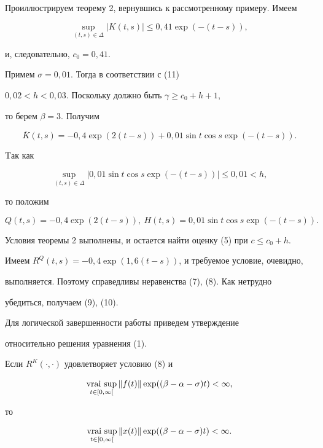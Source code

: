 Проиллюстрируем теорему 2, вернувшись к рассмотренному примеру. Имеем


$$


\sup\limits_{(t,s)\in\Delta}|K(t,s)|\le 0,41\exp(-(t-s)),


$$


и, следовательно, $c_0=0,41$.





Примем $\sigma=0,01$. Тогда в соответствии с (11)


$0,02<h<0,03$. Поскольку должно быть $\gamma\ge c_0+h+1$,


то берем $\beta=3$. Получим


$$


\overline K(t,s)=-0,4\exp(2(t-s))+0,01\sin t\cos s\exp(-(t-s)).


$$





Tак как


$$


\sup\limits_{(t,s)\in\Delta}|0,01\sin t\cos s\exp(-(t-s))|\le 0,01<h,


$$


то положим


$$


Q(t,s)=-0,4\exp(2(t-s)),\ H(t,s)=0,01\sin t\cos s\exp(-(t-s)).


$$


Условия теоремы 2 выполнены, и остается найти оценку (5) при $c\le c_0+h$.


Имеем $R^Q(t,s)=-0,4\exp(1,6(t-s))$, и требуемое условие, очевидно,


выполняется. Поэтому справедливы неравенства (7), (8). Как нетрудно


убедиться, получаем (9), (10).





Для логической завершенности работы приведем утверждение


относительно решения уравнения (1).





\begin{assrtnonum} Если $R^K(\cdot,\cdot)$ удовлетворяет условию (8) и


$$


\vraisup\limits_{t\in[0,\infty[}\|f(t)\|\exp((\beta-\alpha-\sigma)t)<\infty,


$$


то


$$


\vraisup\limits_{t\in[0,\infty[}\|x(t)\|\exp((\beta-\alpha-\sigma)t)<\infty.


$$


\end{assrtnonum}





